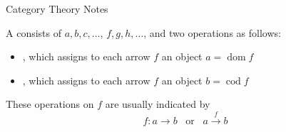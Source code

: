 \documentclass{mathnotes}
\DeclareMathOperator{\dom}{dom}
\DeclareMathOperator{\cod}{cod}
\begin{document}
\begin{center}
  \vspace*{20pt}
  \LARGE{Category Theory Notes}
\end{center}

\begin{defi}
  A  consists of  $a, b, c, \ldots$,
   $f, g, h, \ldots$, and two operations as follows:
  \begin{itemize}
    \item {}, which assigns to each arrow $f$ an object $a=\dom f$
    \item {}, which assigns to each arrow $f$ an object $b=\cod
      f$
  \end{itemize}
  These operations on $f$ are usually indicated by
  \[f:a\rightarrow b\hspace{10pt}\text{or}\hspace{10pt}a\xrightarrow{f}b\]
\end{defi}
\end{document}
